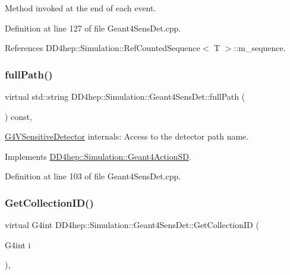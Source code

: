Method invoked at the end of each event. 



Definition at line 127 of file Geant4\+Sens\+Det.\+cpp.



References D\+D4hep\+::\+Simulation\+::\+Ref\+Counted\+Sequence$<$ T $>$\+::m\+\_\+sequence.

\hypertarget{class_d_d4hep_1_1_simulation_1_1_geant4_sens_det_a0a5229cabfdd17f1f370954c9cf9130c}{}\label{class_d_d4hep_1_1_simulation_1_1_geant4_sens_det_a0a5229cabfdd17f1f370954c9cf9130c} 
\subsubsection{\texorpdfstring{full\+Path()}{fullPath()}}
{\footnotesize\ttfamily virtual std\+::string D\+D4hep\+::\+Simulation\+::\+Geant4\+Sens\+Det\+::full\+Path (\begin{DoxyParamCaption}{ }\end{DoxyParamCaption}) const\hspace{0.3cm}{\ttfamily [inline]}, {\ttfamily [virtual]}}



\hyperlink{class_g4_v_sensitive_detector}{G4\+V\+Sensitive\+Detector} internals\+: Access to the detector path name. 



Implements \hyperlink{class_d_d4hep_1_1_simulation_1_1_geant4_action_s_d_afaba405dfb4c663ba2403ad4558d9956}{D\+D4hep\+::\+Simulation\+::\+Geant4\+Action\+SD}.



Definition at line 103 of file Geant4\+Sens\+Det.\+cpp.

\hypertarget{class_d_d4hep_1_1_simulation_1_1_geant4_sens_det_acabf73f9ac2fd034b02bb24d12db8347}{}\label{class_d_d4hep_1_1_simulation_1_1_geant4_sens_det_acabf73f9ac2fd034b02bb24d12db8347} 
\subsubsection{\texorpdfstring{Get\+Collection\+I\+D()}{GetCollectionID()}}
{\footnotesize\ttfamily virtual G4int D\+D4hep\+::\+Simulation\+::\+Geant4\+Sens\+Det\+::\+Get\+Collection\+ID (\begin{DoxyParamCaption}\item[{G4int}]{i }\end{DoxyParamCaption})\hspace{0.3cm}{\ttfamily [inline]}, {\ttfamily [virtual]}}




